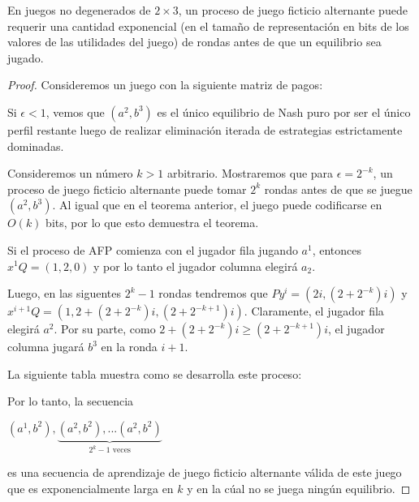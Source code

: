 \begin{theorem}
    En juegos no degenerados de $2 \times 3$, un proceso de juego ficticio alternante puede requerir una cantidad exponencial (en el tamaño de representación en bits de los valores de las utilidades del juego) de rondas antes de que un equilibrio sea jugado.
\end{theorem}

\begin{proof}
    Consideremos un juego con la siguiente matriz de pagos:

    

    Si $\epsilon < 1$, vemos que $(a^2, b^3)$ es el único equilibrio de Nash puro
    por ser el único perfil restante luego de realizar eliminación iterada de estrategias estrictamente dominadas.

    Consideremos un número $k > 1$ arbitrario. Mostraremos que para $\epsilon = 2^{-k}$, un proceso de juego ficticio alternante puede tomar $2^k$ rondas antes de que se juegue $(a^2, b^3)$. Al igual que en el teorema anterior, el juego puede codificarse en $O(k)$ bits, por lo que esto demuestra el teorema.

    Si el proceso de AFP comienza con el jugador fila jugando $a^1$, entonces $x^1Q = (1, 2, 0)$ y por lo tanto el jugador columna elegirá $a_2$.

    Luego, en las siguentes $2^k - 1$ rondas tendremos que $Py^i = (2i, (2+2^{-k})i)$ y $x^{i+1}Q = (1, 2+(2+2^{-k})i, (2+2^{-k+1})i)$. Claramente, el jugador fila elegirá $a^2$. Por su parte, como $2+(2+2^{-k})i \ge (2+2^{-k+1})i$, el jugador columna jugará $b^3$ en la ronda $i + 1$.

    La siguiente tabla muestra como se desarrolla este proceso:

    

    Por lo tanto, la secuencia

    \begin{center}
    \begin{math}
        (a^1, b^2), \underbrace{(a^2, b^2), ... (a^2, b^2)}_{\text{$2^k - 1$ veces}}
    \end{math}
    \end{center}

    es una secuencia de aprendizaje de juego ficticio alternante válida de este juego que es exponencialmente larga en $k$ y en la cúal no se juega ningún equilibrio.

\end{proof}

